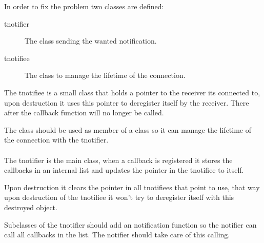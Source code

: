 \documentclass[a4paper,notitlepage,twocolumn,draft]{report}
\begin{document}
In order to fix the problem two classes are defined:

\begin{description}
\item[tnotifier] The class sending the wanted notification.
\item[tnotifiee] The class to manage the lifetime of the connection.
\end{description}

The tnotifiee is a small class that holds a pointer to the receiver its
connected to, upon destruction it uses this pointer to deregister itself by the
receiver. There after the callback function will no longer be called.

The class should be used as member of a class so it can manage the lifetime of
the connection with the tnotifier.

\paragraph{}

The tnotifier is the main class, when a callback is registered it stores the
callbacks in an internal list and updates the pointer in the tnotifiee to
itself.

Upon destruction it clears the pointer in all tnotifiees that point to use, that
way upon destruction of the tnotifiee it won't try to deregister itself with
this destroyed object.

Subclasses of the tnotifier should add an notification function so the notifier
can call all callbacks in the list. The notifier should take care of this
calling.
\end{document}
